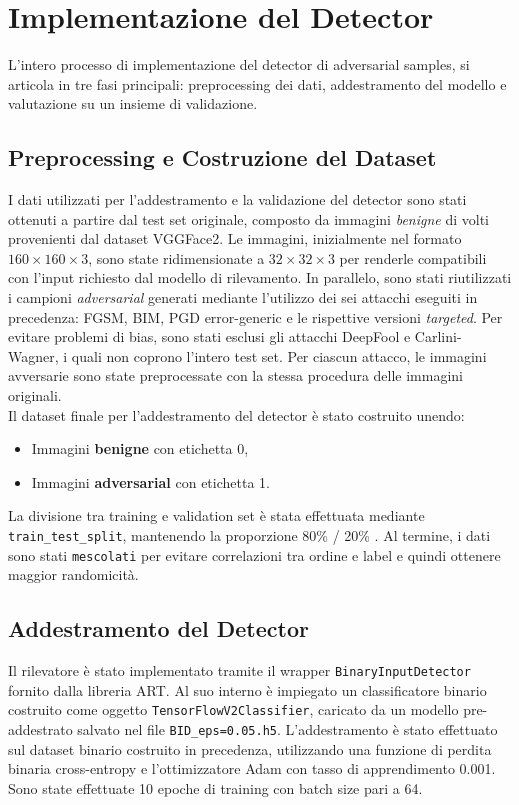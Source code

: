     \section{Implementazione del Detector}
        L’intero processo di implementazione del detector di adversarial samples, si articola in tre fasi principali: preprocessing dei dati, addestramento del modello e valutazione su un insieme di validazione.
        
        \subsection{Preprocessing e Costruzione del Dataset}
            I dati utilizzati per l’addestramento e la validazione del detector sono stati ottenuti a partire dal test set originale, composto da immagini \textit{benigne} di volti provenienti dal dataset VGGFace2. Le immagini, inizialmente nel formato $160\times160\times3$, sono state ridimensionate a $32\times32\times3$ per renderle compatibili con l’input richiesto dal modello di rilevamento.
            In parallelo, sono stati riutilizzati i campioni \textit{adversarial} generati mediante l’utilizzo dei sei attacchi eseguiti in precedenza: FGSM, BIM, PGD error-generic e le rispettive versioni \textit{targeted}. Per evitare problemi di bias, sono stati esclusi gli attacchi DeepFool e Carlini-Wagner, i quali non coprono l’intero test set.
            Per ciascun attacco, le immagini avversarie sono state preprocessate con la stessa procedura delle immagini originali. \\
            Il dataset finale per l’addestramento del detector è stato costruito unendo:
                \begin{itemize}
                    \item Immagini \textbf{benigne} con etichetta 0,
                    \item Immagini \textbf{adversarial} con etichetta 1.
                \end{itemize}
    
            \noindent La divisione tra training e validation set è stata effettuata mediante \texttt{train\_test\_split}, mantenendo la proporzione 80\% / 20\% . Al termine, i dati sono stati \texttt{mescolati} per evitare correlazioni tra ordine e label e quindi   ottenere maggior randomicità.
    
        \subsection{Addestramento del Detector}
            Il rilevatore è stato implementato tramite il wrapper \texttt{BinaryInputDetector} fornito dalla libreria ART. Al suo interno è impiegato un classificatore binario costruito come oggetto \texttt{TensorFlowV2Classifier}, caricato da un modello pre-addestrato salvato nel file \texttt{BID\_eps=0.05.h5}.
            L’addestramento è stato effettuato sul dataset binario costruito in precedenza, utilizzando una funzione di perdita binaria cross-entropy e l’ottimizzatore Adam con tasso di apprendimento 0.001. Sono state effettuate 10 epoche di training con batch size pari a 64.
    
